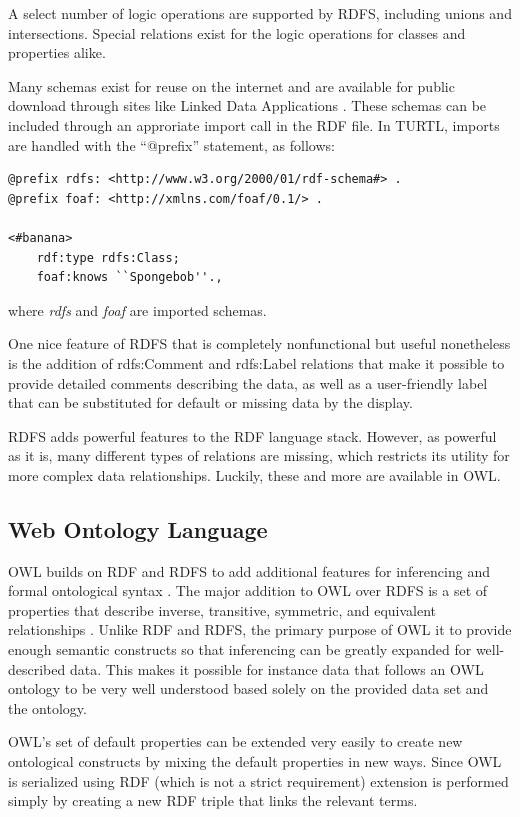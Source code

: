 A select number of logic operations are supported by RDFS, including unions and
intersections. Special relations exist for the logic operations for classes and
properties alike.

Many schemas exist for reuse on the internet and are available for
public download through sites like Linked Data Applications
\cite{noauthor_linked_nodate-1}. These schemas can be included through an
approriate import call in the RDF file. In TURTL, imports are handled with the ``@prefix''
statement, as follows:
\begin{lstlisting}[language=TURTL]
@prefix rdfs: <http://www.w3.org/2000/01/rdf-schema#> .
@prefix foaf: <http://xmlns.com/foaf/0.1/> .

<#banana>
    rdf:type rdfs:Class;
    foaf:knows ``Spongebob''.,
\end{lstlisting}
where \textit{rdfs} and \textit{foaf} are imported schemas.

One nice feature of RDFS that is completely nonfunctional but useful
nonetheless is the addition of rdfs:Comment and rdfs:Label relations that make
it possible to provide detailed comments describing the data, as well as a
user-friendly label that can be substituted for default or missing data by the
display.

RDFS adds powerful features to the RDF language stack. However, as powerful as
it is, many different types of relations are missing, which restricts its
utility for more complex data relationships. Luckily, these and more are
available in OWL.

\subsection{Web Ontology Language}

OWL builds on RDF and RDFS to add additional
features for inferencing and formal ontological syntax \cite{
noauthor_owl_nodate}. The major addition to OWL over RDFS is a set of
properties that describe inverse, transitive, symmetric, and equivalent relationships
\cite{allemang_semantic_2008}. Unlike RDF and RDFS, the primary purpose of OWL
it to provide enough semantic constructs so that inferencing can be greatly
expanded for well-described data. This makes it possible for instance data that
follows an OWL ontology to be very well understood based solely on the provided
data set and the ontology.

OWL's set of default properties can be extended very easily to create new
ontological constructs by mixing the default properties in new ways. Since OWL
is serialized using RDF (which is not a strict requirement) extension is
performed simply by creating a new RDF triple that links the relevant terms.

